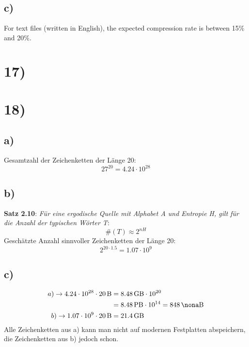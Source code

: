   \subsection*{c)}

  For text files (written in English), the expected compression rate is between 15\% and 20\%.

  \section*{17)}
  \section*{18)}

    \subsection*{a)}

      Gesamtzahl der Zeichenketten der Länge 20:\\
      \[27^{20} = 4.24 \cdot 10^{28} \]

    \subsection*{b)}

      \textbf{Satz 2.10}: \textit{Für eine ergodische Quelle mit Alphabet A und Entropie H, gilt für die Anzahl der typischen Wörter T}:
      \[ \#(T) \approx 2^{nH} \]
      \newline
      Geschätzte Anzahl sinnvoller Zeichenketten der Länge 20:
      \[ 2^{20 \cdot 1.5} = 1.07 \cdot 10^{9} \]

    \subsection*{c)}

      \begin{equation}
      	\begin{split}
      	  a) \rightarrow 4.24 \cdot 10^{28} \cdot \SI{20}{\byte} & = \SI{8.48}{\giga\byte} \cdot 10^{20} \\
      	  & = \SI{8.48}{\peta\byte} \cdot 10^{14} = \SI{848}{\nona\byte} \\
      	  b) \rightarrow 1.07 \cdot 10^{9} \cdot \SI{20}{\byte} & = \SI{21.4}{\giga\byte} \\
      	\end{split}
      \end{equation}
      \newline
      Alle Zeichenketten aus a) kann man nicht auf modernen Festplatten abspeichern, die Zeichenketten aus b) jedoch schon.\\

